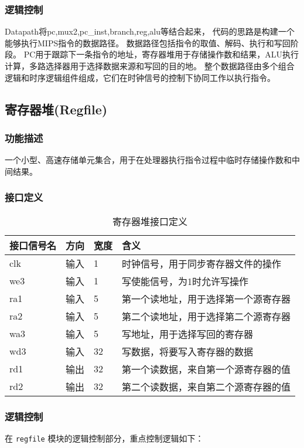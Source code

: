 \subsubsection{逻辑控制}
Datapath将pc,mux2,pc\_inst,branch,reg,alu等结合起来，
代码的思路是构建一个能够执行MIPS指令的数据路径。
数据路径包括指令的取值、解码、执行和写回阶段。
PC用于跟踪下一条指令的地址，寄存器堆用于存储操作数和结果，ALU执行计算，多路选择器用于选择数据来源和写回的目的地。
整个数据路径由多个组合逻辑和时序逻辑组件组成，它们在时钟信号的控制下协同工作以执行指令。

\subsection{寄存器堆(Regfile)}\label{sub:regfile}
\subsubsection{功能描述}
一个小型、高速存储单元集合，用于在处理器执行指令过程中临时存储操作数和中间结果。
\subsubsection{接口定义}
\begin{table}[htp]
	\caption{寄存器堆接口定义}\label{tab:regfile}
	\begin{center}
		\begin{tabular}{|l|l|l|p{8cm}|}
		\hline
		\textbf{接口信号名} & \textbf{方向} & \textbf{宽度} & \textbf{含义}\\ \hline \hline
		clk & 输入 & 1 & 时钟信号，用于同步寄存器文件的操作 \\ 
		we3 & 输入 & 1 & 写使能信号，为1时允许写操作 \\ 
		ra1 & 输入 & 5 & 第一个读地址，用于选择第一个源寄存器 \\ 
		ra2 & 输入 & 5 & 第二个读地址，用于选择第二个源寄存器 \\ 
		wa3 & 输入 & 5 & 写地址，用于选择写回的寄存器 \\ 
		wd3 & 输入 & 32 & 写数据，将要写入寄存器的数据 \\ 
		rd1 & 输出 & 32 & 第一个读数据，来自第一个源寄存器的值 \\ 
		rd2 & 输出 & 32 & 第二个读数据，来自第二个源寄存器的值 \\ 
		\hline
		\end{tabular}
	\end{center}
	\end{table}
\subsubsection{逻辑控制}
在 \texttt{regfile} 模块的逻辑控制部分，重点控制逻辑如下：

